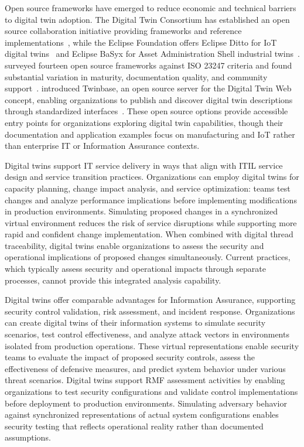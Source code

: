 Open source frameworks have emerged to reduce economic and technical barriers to digital twin adoption. The Digital Twin Consortium has established an open source collaboration initiative providing frameworks and reference implementations~\parencite{DTC_OpenSource_2024}, while the Eclipse Foundation offers Eclipse Ditto for IoT digital twins~\parencite{Eclipse_Ditto_2024} and Eclipse BaSyx for Asset Administration Shell industrial twins~\parencite{Eclipse_BaSyx_2024}. \citeauthor{Gil_2024} surveyed fourteen open source frameworks against ISO 23247 criteria and found substantial variation in maturity, documentation quality, and community support~\parencite{Gil_2024}. \citeauthor{Autiosalo_Siegel_Tammi_2021} introduced Twinbase, an open source server for the Digital Twin Web concept, enabling organizations to publish and discover digital twin descriptions through standardized interfaces~\parencite{Autiosalo_Siegel_Tammi_2021}. These open source options provide accessible entry points for organizations exploring digital twin capabilities, though their documentation and application examples focus on manufacturing and IoT rather than enterprise IT or Information Assurance contexts.

Digital twins support IT service delivery in ways that align with ITIL service design and service transition practices. Organizations can employ digital twins for capacity planning, change impact analysis, and service optimization: teams test changes and analyze performance implications before implementing modifications in production environments. Simulating proposed changes in a synchronized virtual environment reduces the risk of service disruptions while supporting more rapid and confident change implementation. When combined with digital thread traceability, digital twins enable organizations to assess the security and operational implications of proposed changes simultaneously. Current practices, which typically assess security and operational impacts through separate processes, cannot provide this integrated analysis capability.

Digital twins offer comparable advantages for Information Assurance, supporting security control validation, risk assessment, and incident response. Organizations can create digital twins of their information systems to simulate security scenarios, test control effectiveness, and analyze attack vectors in environments isolated from production operations. These virtual representations enable security teams to evaluate the impact of proposed security controls, assess the effectiveness of defensive measures, and predict system behavior under various threat scenarios. Digital twins support RMF assessment activities by enabling organizations to test security configurations and validate control implementations before deployment to production environments. Simulating adversary behavior against synchronized representations of actual system configurations enables security testing that reflects operational reality rather than documented assumptions.

